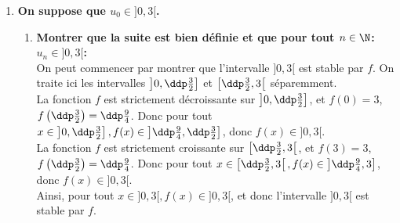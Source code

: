 \begin{correction}
\begin{enumerate}
\begin{itemize}
\end{itemize}
\item \textbf{On suppose que $u_0\in\rbrack 0,3\lbrack$.}
\begin{enumerate}
\item \textbf{Montrer que la suite est bien d\'efinie et que pour tout $n\in\N$: $u_n\in\rbrack 0,3\lbrack$:}\\
\noindent 
On peut commencer par montrer que l'intervalle $\rbrack 0,3\lbrack$ est stable par $f$. On traite ici les intervalles $\left\rbrack 0,\ddp\frac{3}{2}\right\rbrack$ et  $\left\lbrack \ddp\frac{3}{2},3\right\lbrack$ s\'eparemment.\\
La fonction $f$ est strictement d\'ecroissante sur $\left\rbrack 0,\ddp\frac{3}{2}\right\rbrack$, et $f( 0)=3$, $f\left( \ddp\frac{3}{2}\right)=\ddp\frac{9}{4}$. Donc pour tout $x \in \left\rbrack 0,\ddp\frac{3}{2}\right\rbrack, f(x) \in \left\rbrack \ddp \frac{9}{4},\ddp\frac{3}{2}\right\rbrack$, donc $f(x) \in \rbrack 0,3\lbrack$.\\
La fonction $f$ est strictement croissante sur $\left\lbrack \ddp\frac{3}{2},3\right\lbrack$, et $f\left(3\right)=3$, $f\left( \ddp\frac{3}{2}\right)=\ddp\frac{9}{4}$. Donc pour tout $x \in \left\lbrack \ddp\frac{3}{2},3\right\lbrack, f(x) \in \left\rbrack \ddp \frac{9}{4},3\right\rbrack$, donc $f(x) \in \rbrack 0,3\lbrack$.\\
Ainsi, pour tout $x \in \rbrack 0,3\lbrack, f(x) \in \rbrack 0,3\lbrack$, et donc l'intervalle $\rbrack 0,3\lbrack$ est stable par $f$.\\

\end{enumerate}
\end{enumerate}
\end{correction}

